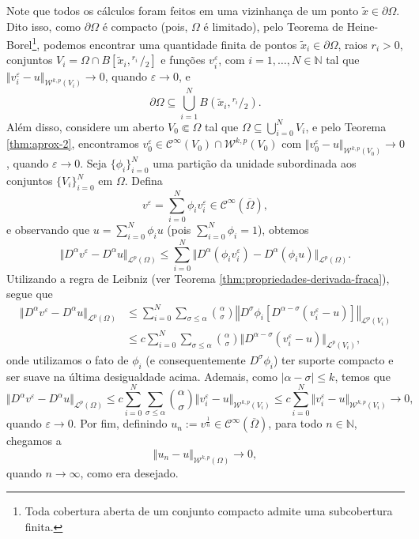 \documentclass[a4paper, 11pt]{book}
\theoremstyle{definition}
\newcommand{\bN}{\mathbb{N}}
\newcommand{\cC}{\mathcal{C}}
\newcommand{\cL}{\mathcal{L}}
\newcommand{\cW}{\mathcal{W}}
\newcommand{\sfrac}[2]{{}^{#1}\!\!/\!_{#2}}
\begin{document}
\begin{prf}
    Note que todos os cálculos foram feitos em uma vizinhança de um ponto $\tilde x \in \partial\Omega$. Dito isso, como $\partial \Omega$ é compacto (pois, $\Omega$ é limitado), pelo Teorema de Heine-Borel\footnote{Toda cobertura aberta de um conjunto compacto admite uma subcobertura finita.}, podemos encontrar uma quantidade finita de pontos $\tilde x_i \in \partial \Omega$, raios $r_i > 0$, conjuntos $V_i = \Omega \cap B[\tilde x_i,\sfrac{r_i\,}{2}]$ e funções $v_i^\varepsilon$, com $i = 1,\dots,N \in \bN$ tal que $\Vert v_i^\varepsilon - u \Vert_{\cW^{k,p}(V_i)} \to 0$, quando $\varepsilon \to 0$, e 
    \[
        \partial\Omega \subseteq \bigcup_{i=1}^N B(\tilde x_i, \sfrac{r_i}{2}).
    \]
    Além disso, considere um aberto $V_0 \Subset \Omega$ tal que $\Omega \subseteq \bigcup_{i=0}^N V_i$, e pelo Teorema \ref{thm:aprox-2}, encontramos $v_0^\varepsilon \in \cC^{\infty}(V_0) \cap \cW^{k,p}(V_0)$ com $\Vert v_0^\varepsilon - u \Vert_{\cW^{k,p}(V_0)} \to 0$, quando $\varepsilon \to 0$.
    Seja $\{\phi_i\}_{i=0}^N$ uma partição da unidade subordinada aos conjuntos $\{V_i\}_{i=0}^N$ em $\Omega$.
    Defina
    \[
        v^\varepsilon = \sum_{i=0}^N \phi_i v_i^\varepsilon \in \cC^{\infty}(\overline\Omega),
    \]
    e observando que $u = \sum_{i=0}^N \phi_i u$ (pois $\sum_{i=0}^N \phi_i = 1$), obtemos
    \[
        \Vert D^\alpha v^\varepsilon - D^\alpha u \Vert_{\cL^p(\Omega)} \leqslant \sum_{i=0}^N \Vert D^\alpha (\phi_i v_i^\varepsilon) - D^\alpha(\phi_i u) \Vert_{\cL^p(\Omega)}.
    \]
    Utilizando a regra de Leibniz (ver Teorema \ref{thm:propriedades-derivada-fraca}), segue que
    \[
        \begin{aligned}
            \Vert D^\alpha v^\varepsilon - D^\alpha u \Vert_{\cL^p(\Omega)} &\leqslant \sum_{i=0}^N\sum_{\sigma \leqslant \alpha} \binom{\alpha}{\sigma} \left\Vert  D^{\sigma} \phi_i \left[ D^{\alpha - \sigma} \left( v_i^\varepsilon - u \right) \right] \right\Vert _{\cL^p(V_i)}\\ 
            &\leqslant c\sum_{i=0}^N\sum_{\sigma \leqslant \alpha} \binom{\alpha}{\sigma} \Vert D^{\alpha-\sigma}(v^\varepsilon_i - u) \Vert_{\cL^p(V_i)},
        \end{aligned}
    \]
    onde utilizamos o fato de $\phi_i$ (e consequentemente $D^\sigma \phi_i$) ter suporte compacto e ser suave na última desigualdade acima. 
    Ademais, como $|\alpha - \sigma| \leqslant k$, temos que
    \[
        \Vert D^\alpha v^\varepsilon - D^\alpha u \Vert_{\cL^p(\Omega)} \leqslant c \sum_{i=0}^N\sum_{\sigma \leqslant \alpha} \binom{\alpha}{\sigma} \Vert v_i^\varepsilon - u \Vert_{\cW^{k,p}(V_i)} \leqslant c\sum_{i=0}^N \Vert v_i^\varepsilon - u \Vert_{\cW^{k,p}(V_i)} \to 0 ,
    \]
    quando $\varepsilon \to 0$.
    Por fim, definindo $u_n := v^{\frac{1}{n}} \in \cC^{\infty}(\overline\Omega)$, para todo $n \in \bN$, chegamos a 
    \[
        \Vert u_n - u \Vert_{\cW^{k,p}(\Omega)} \to 0,
    \]
    quando $n \to \infty$, como era desejado.
\end{prf}
\end{document}
